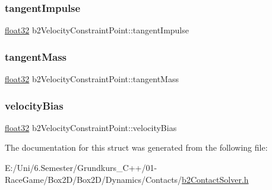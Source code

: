 \subsubsection{\texorpdfstring{tangentImpulse}{tangentImpulse}}
{\footnotesize\ttfamily \mbox{\hyperlink{b2_settings_8h_aacdc525d6f7bddb3ae95d5c311bd06a1}{float32}} b2\+Velocity\+Constraint\+Point\+::tangent\+Impulse}

\mbox{\label{structb2_velocity_constraint_point_a029692226a637f5e687022041b25043c}} 
\subsubsection{\texorpdfstring{tangentMass}{tangentMass}}
{\footnotesize\ttfamily \mbox{\hyperlink{b2_settings_8h_aacdc525d6f7bddb3ae95d5c311bd06a1}{float32}} b2\+Velocity\+Constraint\+Point\+::tangent\+Mass}

\mbox{\label{structb2_velocity_constraint_point_a81d492345d9b1c8f51ec10154ab840f2}} 
\subsubsection{\texorpdfstring{velocityBias}{velocityBias}}
{\footnotesize\ttfamily \mbox{\hyperlink{b2_settings_8h_aacdc525d6f7bddb3ae95d5c311bd06a1}{float32}} b2\+Velocity\+Constraint\+Point\+::velocity\+Bias}



The documentation for this struct was generated from the following file\+:\begin{DoxyCompactItemize}
\item 
E\+:/\+Uni/6.\+Semester/\+Grundkurs\+\_\+\+C++/01-\/\+Race\+Game/\+Box2\+D/\+Box2\+D/\+Dynamics/\+Contacts/\mbox{\hyperlink{b2_contact_solver_8h}{b2\+Contact\+Solver.\+h}}\end{DoxyCompactItemize}
